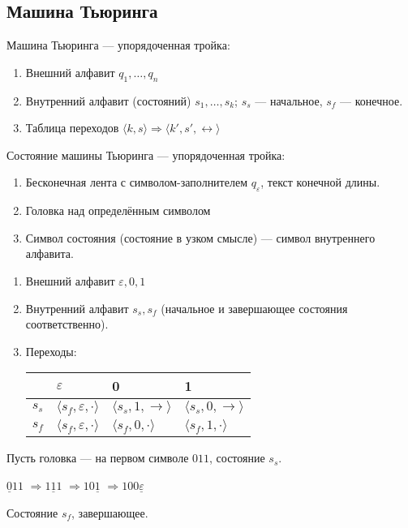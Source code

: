 \subsection{Машина Тьюринга}
\begin{definition}
    Машина Тьюринга --- упорядоченная тройка:
\begin{enumerate}
\item Внешний алфавит $q_1, \dots, q_n$
\item Внутренний алфавит (состояний) $s_1, \dots, s_k$; $s_s$ --- начальное, $s_f$ --- конечное.
\item Таблица переходов $\langle k, s \rangle \Rightarrow \langle k', s', \leftrightarrow \rangle$
\end{enumerate}
\end{definition}

\begin{definition}
    Состояние машины Тьюринга --- упорядоченная тройка:
\begin{enumerate}
\item Бесконечная лента с символом-заполнителем $q_\varepsilon$, текст конечной длины.
\item Головка над определённым символом
\item Символ состояния (состояние в узком смысле) --- символ внутреннего алфавита.
\end{enumerate}
\end{definition}


\begin{example}
\begin{enumerate}
    \item Внешний алфавит $\varepsilon, 0, 1$
    \item Внутренний алфавит $s_s, s_f$ (начальное и завершающее состояния соответственно).
    \item Переходы:

    \begin{tabular}{l|lll}
    & $\varepsilon$ & 0 & 1\\\hline
    $s_s$ & $\langle s_f,\varepsilon,\cdot\rangle$ & $\langle s_s,1,\rightarrow\rangle$ & $\langle s_s,0,\rightarrow\rangle$\\
    $s_f$ & $\langle s_f,\varepsilon,\cdot\rangle$ & $\langle s_f,0,\cdot\rangle$ & $\langle s_f,1,\cdot\rangle$
\end{tabular}
\end{enumerate}

Пусть головка --- на первом символе $0 1 1$, состояние $s_s$.

$\underline{0} 1 1$  $\Rightarrow 1 \underline{1} 1$  $\Rightarrow 1 0 \underline{1}$  $\Rightarrow 1 0 0 \underline{\varepsilon}$

Состояние $s_f$, завершающее.
\end{example}




